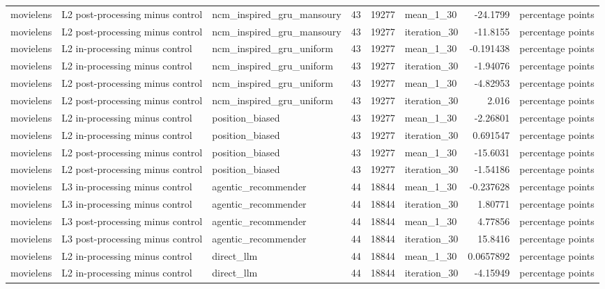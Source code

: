 \begin{table}[htbp!]
\begin{tabular}{lllrrlrl}
movielens & L2 post-processing minus control & ncm\_inspired\_gru\_mansoury & 43 & 19277 & mean\_1\_30 & -24.1799 & percentage points \\
movielens & L2 post-processing minus control & ncm\_inspired\_gru\_mansoury & 43 & 19277 & iteration\_30 & -11.8155 & percentage points \\
movielens & L2 in-processing minus control & ncm\_inspired\_gru\_uniform & 43 & 19277 & mean\_1\_30 & -0.191438 & percentage points \\
movielens & L2 in-processing minus control & ncm\_inspired\_gru\_uniform & 43 & 19277 & iteration\_30 & -1.94076 & percentage points \\
movielens & L2 post-processing minus control & ncm\_inspired\_gru\_uniform & 43 & 19277 & mean\_1\_30 & -4.82953 & percentage points \\
movielens & L2 post-processing minus control & ncm\_inspired\_gru\_uniform & 43 & 19277 & iteration\_30 & 2.016 & percentage points \\
movielens & L2 in-processing minus control & position\_biased & 43 & 19277 & mean\_1\_30 & -2.26801 & percentage points \\
movielens & L2 in-processing minus control & position\_biased & 43 & 19277 & iteration\_30 & 0.691547 & percentage points \\
movielens & L2 post-processing minus control & position\_biased & 43 & 19277 & mean\_1\_30 & -15.6031 & percentage points \\
movielens & L2 post-processing minus control & position\_biased & 43 & 19277 & iteration\_30 & -1.54186 & percentage points \\
movielens & L3 in-processing minus control & agentic\_recommender & 44 & 18844 & mean\_1\_30 & -0.237628 & percentage points \\
movielens & L3 in-processing minus control & agentic\_recommender & 44 & 18844 & iteration\_30 & 1.80771 & percentage points \\
movielens & L3 post-processing minus control & agentic\_recommender & 44 & 18844 & mean\_1\_30 & 4.77856 & percentage points \\
movielens & L3 post-processing minus control & agentic\_recommender & 44 & 18844 & iteration\_30 & 15.8416 & percentage points \\
movielens & L2 in-processing minus control & direct\_llm & 44 & 18844 & mean\_1\_30 & 0.0657892 & percentage points \\
movielens & L2 in-processing minus control & direct\_llm & 44 & 18844 & iteration\_30 & -4.15949 & percentage points \\

\end{tabular}
\end{table}
